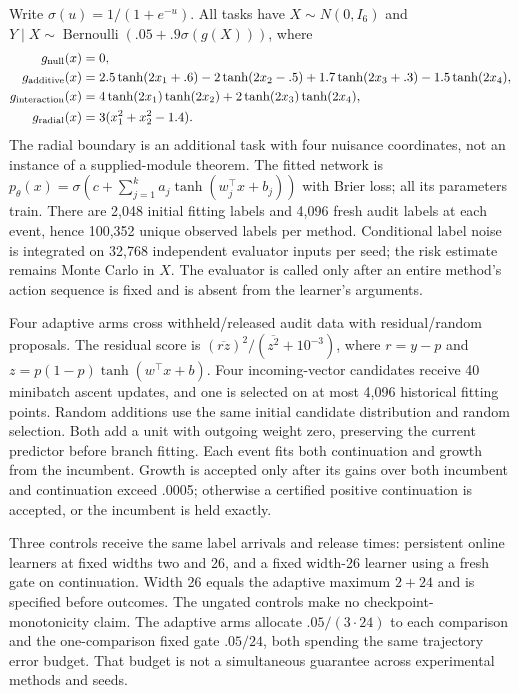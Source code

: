 Write $\sigma(u)=1/(1+e^{-u})$. All tasks have $X\sim N(0,I_6)$ and
$Y\mid X\sim\operatorname{Bernoulli}(.05+.9\sigma(g(X)))$, where
\begin{align*}
g_{\rm null}(x)&=0,\\
g_{\rm additive}(x)&=2.5\tanh(2x_1+.6)-2\tanh(2x_2-.5)
 +1.7\tanh(2x_3+.3)-1.5\tanh(2x_4),\\
g_{\rm interaction}(x)&=4\tanh(2x_1)\tanh(2x_2)
 +2\tanh(2x_3)\tanh(2x_4),\\
g_{\rm radial}(x)&=3(x_1^2+x_2^2-1.4).
\end{align*}
The radial boundary is an additional task with four nuisance coordinates,
not an instance of a supplied-module theorem. The fitted network is
$p_\theta(x)=\sigma(c+\sum_{j=1}^k a_j\tanh(w_j^\top x+b_j))$ with Brier
loss; all its parameters train. There are 2,048 initial fitting labels and
4,096 fresh audit labels at each event, hence 100,352 unique observed labels
per method. Conditional label noise is integrated on 32,768 independent
evaluator inputs per seed; the risk estimate remains Monte Carlo in $X$.
The evaluator is called only after an entire method's action sequence is
fixed and is absent from the learner's arguments.

Four adaptive arms cross withheld/released audit data with residual/random
proposals. The residual score is
$(\overline{rz})^2/(\overline{z^2}+10^{-3})$, where
$r=y-p$ and $z=p(1-p)\tanh(w^\top x+b)$. Four incoming-vector candidates
receive 40 minibatch ascent updates, and one is selected on at most 4,096
historical fitting points. Random additions use the same initial candidate
distribution and random selection. Both add a unit with outgoing weight
zero, preserving the current predictor before branch fitting. Each event
fits both continuation and growth from the incumbent. Growth is accepted
only after its gains over both incumbent and continuation exceed .0005;
otherwise a certified positive continuation is accepted, or the incumbent
is held exactly.

Three controls receive the same label arrivals and release times: persistent
online learners at fixed widths two and 26, and a fixed width-26 learner
using a fresh gate on continuation. Width 26 equals the adaptive maximum
$2+24$ and is specified before outcomes. The ungated controls make no
checkpoint-monotonicity claim. The adaptive arms allocate $.05/(3\cdot24)$
to each comparison and the one-comparison fixed gate $.05/24$, both spending
the same trajectory error budget. That budget is not a simultaneous
guarantee across experimental methods and seeds.

